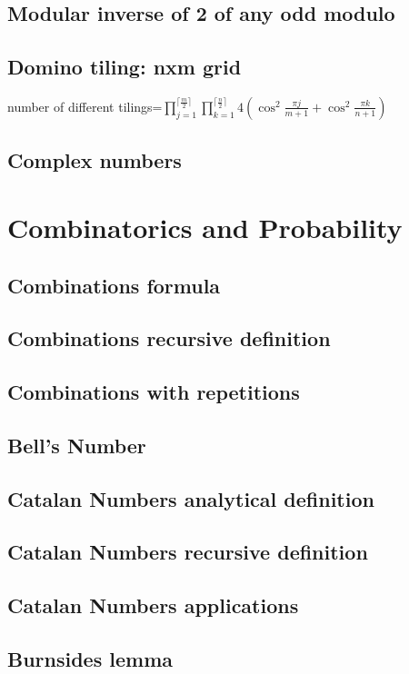 \subsection{Modular inverse of 2 of any odd modulo}
\subsection{Domino tiling: nxm grid}
{
number of different tilings=$\prod_{j=1}^{\lceil{\frac{m}{2}}\rceil} \prod_{k=1}^{\lceil{\frac{n}{2}}\rceil}4({\cos^2{\frac{{\pi}j}{m+1}}}+{\cos^2{\frac{{\pi}k}{n+1}}})$
}
\subsection{Complex numbers}

\section{Combinatorics and Probability}
\subsection{Combinations formula}
\subsection{Combinations recursive definition}
\subsection{Combinations with repetitions}
\subsection{Bell’s Number}
\subsection{Catalan Numbers analytical definition}
\subsection{Catalan Numbers recursive definition}
\subsection{Catalan Numbers applications}
\subsection{Burnsides lemma}


